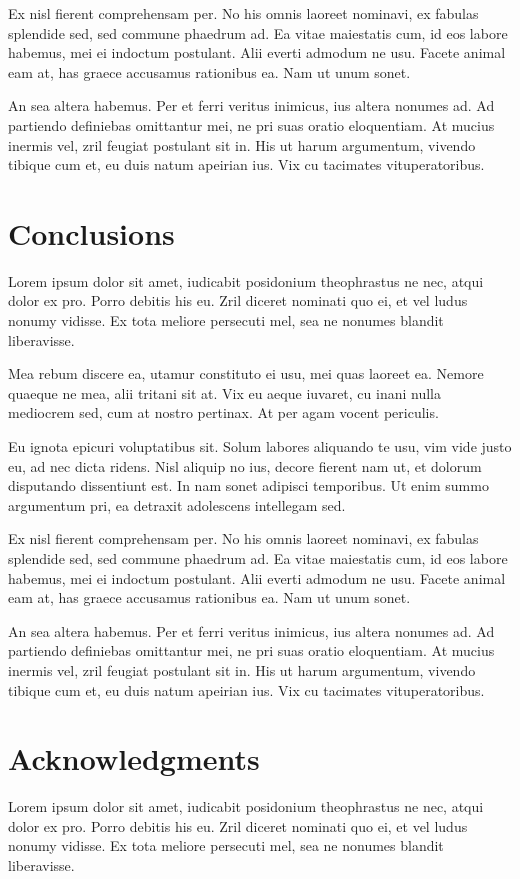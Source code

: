 \documentclass[10pt,onecolumn]{article}
\begin{document}
Ex nisl fierent comprehensam per. No his omnis laoreet nominavi, ex fabulas splendide sed, sed commune phaedrum ad. Ea vitae maiestatis cum, id eos labore habemus, mei ei indoctum postulant. Alii everti admodum ne usu. Facete animal eam at, has graece accusamus rationibus ea. Nam ut unum sonet.

An sea altera habemus. Per et ferri veritus inimicus, ius altera nonumes ad. Ad partiendo definiebas omittantur mei, ne pri suas oratio eloquentiam. At mucius inermis vel, zril feugiat postulant sit in. His ut harum argumentum, vivendo tibique cum et, eu duis natum apeirian ius. Vix cu tacimates vituperatoribus.
%
\section{Conclusions}
%
Lorem ipsum dolor sit amet, iudicabit posidonium theophrastus ne nec, atqui dolor ex pro. Porro debitis his eu. Zril diceret nominati quo ei, et vel ludus nonumy vidisse. Ex tota meliore persecuti mel, sea ne nonumes blandit liberavisse.

Mea rebum discere ea, utamur constituto ei usu, mei quas laoreet ea. Nemore quaeque ne mea, alii tritani sit at. Vix eu aeque iuvaret, cu inani nulla mediocrem sed, cum at nostro pertinax. At per agam vocent periculis.

Eu ignota epicuri voluptatibus sit. Solum labores aliquando te usu, vim vide justo eu, ad nec dicta ridens. Nisl aliquip no ius, decore fierent nam ut, et dolorum disputando dissentiunt est. In nam sonet adipisci temporibus. Ut enim summo argumentum pri, ea detraxit adolescens intellegam sed.

Ex nisl fierent comprehensam per. No his omnis laoreet nominavi, ex fabulas splendide sed, sed commune phaedrum ad. Ea vitae maiestatis cum, id eos labore habemus, mei ei indoctum postulant. Alii everti admodum ne usu. Facete animal eam at, has graece accusamus rationibus ea. Nam ut unum sonet.

An sea altera habemus. Per et ferri veritus inimicus, ius altera nonumes ad. Ad partiendo definiebas omittantur mei, ne pri suas oratio eloquentiam. At mucius inermis vel, zril feugiat postulant sit in. His ut harum argumentum, vivendo tibique cum et, eu duis natum apeirian ius. Vix cu tacimates vituperatoribus.
%
\section*{Acknowledgments}
%
Lorem ipsum dolor sit amet, iudicabit posidonium theophrastus ne nec, atqui dolor ex pro. Porro debitis his eu. Zril diceret nominati quo ei, et vel ludus nonumy vidisse. Ex tota meliore persecuti mel, sea ne nonumes blandit liberavisse.
\end{document}
